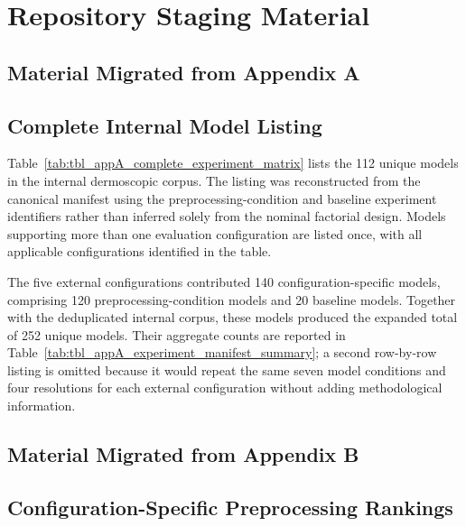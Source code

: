 
\chapter{Repository Staging Material}
\label{app:repository_staging}

\section{Material Migrated from Appendix A}
\section{Complete Internal Model Listing}

Table~\ref{tab:tbl_appA_complete_experiment_matrix} lists the 112 unique models in the internal dermoscopic corpus. The listing was reconstructed from the canonical manifest using the preprocessing-condition and baseline experiment identifiers rather than inferred solely from the nominal factorial design. Models supporting more than one evaluation configuration are listed once, with all applicable configurations identified in the table.

The five external configurations contributed 140 configuration-specific models, comprising 120 preprocessing-condition models and 20 baseline models. Together with the deduplicated internal corpus, these models produced the expanded total of 252 unique models. Their aggregate counts are reported in Table~\ref{tab:tbl_appA_experiment_manifest_summary}; a second row-by-row listing is omitted because it would repeat the same seven model conditions and four resolutions for each external configuration without adding methodological information.



\section{Material Migrated from Appendix B}

\section{Configuration-Specific Preprocessing Rankings}

